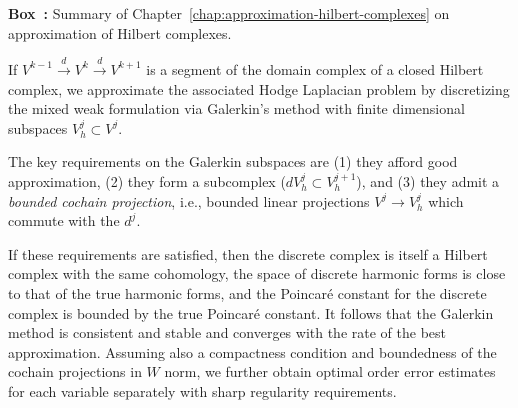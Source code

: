 \begin{tcolorbox}[enhanced,breakable,colback=KuangNei,frame hidden,boxrule=0pt,sharpish corners,before skip=10pt,after skip=10pt]
\label{box:approximation-hilbert-summary}
\noindent\textbf{Box~\thebooksummary:} {Summary of Chapter~\ref{chap:approximation-hilbert-complexes} on approximation of Hilbert complexes.}\par

{If $V^{k-1}\xrightarrow{d}V^k\xrightarrow{d}V^{k+1}$ is a segment of the domain complex of a closed Hilbert complex, we approximate the associated Hodge Laplacian problem by discretizing the mixed weak formulation via Galerkin's method with finite dimensional subspaces $V_h^j\subset V^j$.}

{The key requirements on the Galerkin subspaces are (1) they afford good approximation, (2) they form a subcomplex ($dV_h^j\subset V_h^{j+1}$), and (3) they admit a \emph{bounded cochain projection}, i.e., bounded linear projections $V^j\to V_h^j$ which commute with the $d^j$.}

{If these requirements are satisfied, then the discrete complex is itself a Hilbert complex with the same cohomology, the space of discrete harmonic forms is close to that of the true harmonic forms, and the Poincaré constant for the discrete complex is bounded by the true Poincaré constant. It follows that the Galerkin method is consistent and stable and converges with the rate of the best approximation. Assuming also a compactness condition and boundedness of the cochain projections in $W$ norm, we further obtain optimal order error estimates for each variable separately with sharp regularity requirements.}
\end{tcolorbox}

